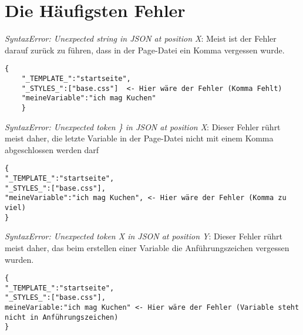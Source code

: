 \documentclass[ngerman,a4paper]{scrartcl}
\begin{document}
\section{Die Häufigsten Fehler}
\textit{SyntaxError: Unexpected string in JSON at position X}: 
\newline
Meist ist der Fehler darauf zurück zu führen, dass in der Page-Datei 
ein Komma vergessen wurde.
\begin{lstlisting}[style=JSSTE]
	{
	"_TEMPLATE_":"startseite",
	"_STYLES_":["base.css"]  <- Hier wäre der Fehler (Komma Fehlt)
	"meineVariable":"ich mag Kuchen"
	}
\end{lstlisting}

\textit{SyntaxError: Unexpected token \} in JSON at position X}: 
\newline
Dieser Fehler rührt meist daher, die letzte Variable in der Page-Datei nicht mit einem Komma abgeschlossen werden darf
\begin{lstlisting}[style=JSSTE]
{
"_TEMPLATE_":"startseite",
"_STYLES_":["base.css"],  
"meineVariable":"ich mag Kuchen", <- Hier wäre der Fehler (Komma zu viel)
}
\end{lstlisting}

\textit{SyntaxError: Unexpected token X in JSON at position Y}: 
\newline
Dieser Fehler rührt meist daher, das beim erstellen einer Variable die Anführungszeichen vergessen wurden.
\begin{lstlisting}[style=JSSTE]
{
"_TEMPLATE_":"startseite",
"_STYLES_":["base.css"],  
meineVariable:"ich mag Kuchen" <- Hier wäre der Fehler (Variable steht nicht in Anführungszeichen)
}
\end{lstlisting}







	
\end{document}
